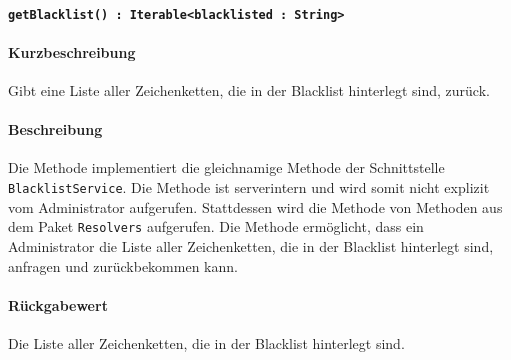 \paragraph{\texttt{getBlacklist() : Iterable<blacklisted : String>}}%
\paragraph*{Kurzbeschreibung}
Gibt eine Liste aller Zeichenketten, die in der Blacklist hinterlegt sind, zurück.
\paragraph*{Beschreibung}
Die Methode implementiert die gleichnamige Methode der Schnittstelle \texttt{BlacklistService}.
Die Methode ist serverintern und wird somit nicht explizit vom Administrator aufgerufen.
Stattdessen wird die Methode von Methoden aus dem Paket \texttt{Resolvers} aufgerufen.
Die Methode ermöglicht, dass ein Administrator die Liste aller Zeichenketten, die in der Blacklist hinterlegt sind, anfragen und zurückbekommen kann.
\paragraph*{Rückgabewert}
Die Liste aller Zeichenketten, die in der Blacklist hinterlegt sind.
